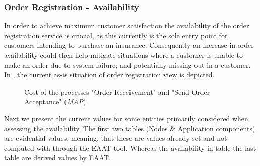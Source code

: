 \subsubsection{Order Registration - Availability}
\label{sec:order_availability}
In order to achieve maximum customer satisfaction the availability of the order registration service is crucial, as this currently is the sole entry point for customers intending to purchase an insurance. Consequently an increase in order availability could then help mitigate situations where a customer is unable to make an order due to system failure; and potentially missing out in a customer. In , the current as-is situation of order registration view is depicted.
\begin{center}
	\begin{figure}[H]
		\centering
		\setlength\fboxsep{7pt}
		\setlength\fboxrule{0.5pt}
		\caption{Cost of the processes "Order Receivement" and "Send Order Acceptance" (\emph{MAP})}
		\label{fig:map_order_availability}
	\end{figure}
\end{center}
Next we present the current values for some entities primarily considered when assessing the availability. The first two tables (Nodes \& Application components) are evidential values, meaning, that these are values already set and not computed with through the EAAT tool. Whereas the availability in table the last table are derived values by EAAT.

%
